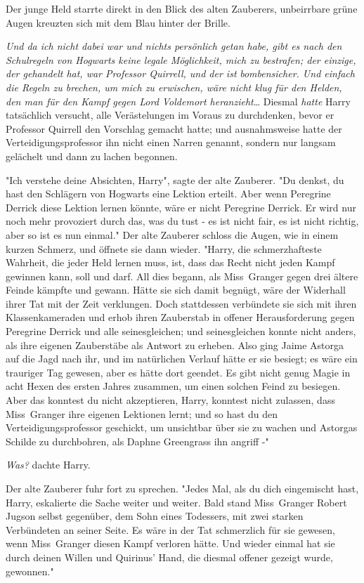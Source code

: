 {Der junge Held starrte direkt in den Blick des alten Zauberers, unbeirrbare grüne Augen kreuzten sich mit dem Blau hinter der Brille.

\emph{Und da ich nicht dabei war und nichts persönlich getan habe, gibt es nach den Schulregeln von Hogwarts keine legale Möglichkeit, mich zu bestrafen; der einzige, der gehandelt hat, war Professor Quirrell, und der ist} \emph{bombensicher. Und einfach die Regeln zu brechen, um mich zu erwischen, wäre nicht klug für den Helden, den man für den Kampf gegen Lord Voldemort heranzieht}… Diesmal \emph{hatte} Harry tatsächlich versucht, alle Verästelungen im Voraus zu durchdenken, bevor er Professor Quirrell den Vorschlag gemacht hatte; und ausnahmsweise hatte der Verteidigungsprofessor ihn nicht einen Narren genannt, sondern nur langsam gelächelt und dann zu lachen begonnen.

"Ich verstehe deine Absichten, Harry", sagte der alte Zauberer. "Du denkst, du hast den Schlägern von Hogwarts eine Lektion erteilt. Aber wenn Peregrine Derrick diese Lektion lernen könnte, wäre er nicht Peregrine Derrick. Er wird nur noch mehr provoziert durch das, was du tust - es ist nicht fair, es ist nicht richtig, aber so ist es nun einmal." Der alte Zauberer schloss die Augen, wie in einem kurzen Schmerz, und öffnete sie dann wieder. "Harry, die schmerzhafteste Wahrheit, die jeder Held lernen muss, ist, dass das Recht nicht jeden Kampf gewinnen kann, soll und darf. All dies begann, als Miss~Granger gegen drei ältere Feinde kämpfte und gewann. Hätte sie sich damit begnügt, wäre der Widerhall ihrer Tat mit der Zeit verklungen. Doch stattdessen verbündete sie sich mit ihren Klassenkameraden und erhob ihren Zauberstab in offener Herausforderung gegen Peregrine Derrick und alle seinesgleichen; und seinesgleichen konnte nicht anders, als ihre eigenen Zauberstäbe als Antwort zu erheben. Also ging Jaime Astorga auf die Jagd nach ihr, und im natürlichen Verlauf hätte er sie besiegt; es wäre ein trauriger Tag gewesen, aber es hätte dort geendet. Es gibt nicht genug Magie in acht Hexen des ersten Jahres zusammen, um einen solchen Feind zu besiegen. Aber das konntest du nicht akzeptieren, Harry, konntest nicht zulassen, dass Miss~Granger ihre eigenen Lektionen lernt; und so hast du den Verteidigungsprofessor geschickt, um unsichtbar über sie zu wachen und Astorgas Schilde zu durchbohren, als Daphne Greengrass ihn angriff -"

\emph{Was?} dachte Harry.

Der alte Zauberer fuhr fort zu sprechen. "Jedes Mal, als du dich eingemischt hast, Harry, eskalierte die Sache weiter und weiter. Bald stand Miss~Granger Robert Jugson selbst gegenüber, dem Sohn eines Todessers, mit zwei starken Verbündeten an seiner Seite. Es wäre in der Tat schmerzlich für sie gewesen, wenn Miss~Granger diesen Kampf verloren hätte. Und wieder einmal hat sie durch deinen Willen und Quirinus' Hand, die diesmal offener gezeigt wurde, gewonnen."

}
